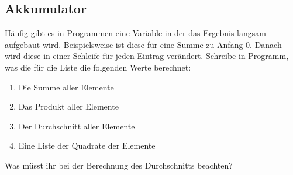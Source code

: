 \subsection{Akkumulator }

Häufig gibt es in Programmen eine Variable in der das Ergebnis langsam aufgebaut
wird. Beispielsweise ist diese für eine Summe zu Anfang $0$. Danach wird diese
in einer Schleife für jeden Eintrag verändert. Schreibe in Programm, was die
für die Liste \pythoninline{[1, 2, 3, 4, 5, 6, 7]} die folgenden Werte berechnet:

\begin{enumerate}
    \item Die Summe aller Elemente
    \item Das Produkt aller Elemente
    \item Der Durchschnitt aller Elemente
    \item Eine Liste der Quadrate der Elemente
\end{enumerate}

Was müsst ihr bei der Berechnung des Durchschnitts beachten?
